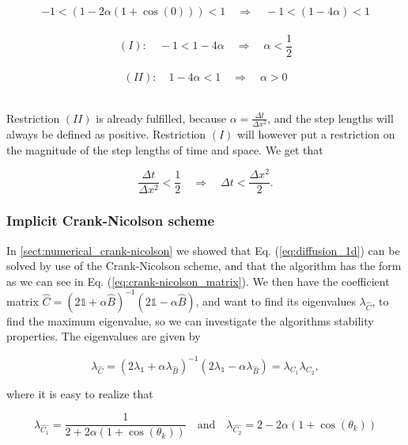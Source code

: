 \documentclass[12pt]{article}
\begin{document}
\begin{flushleft}
\vspace{5mm}
$$-1 < (1-2\alpha(1+\cos(0))) < 1 \quad\Rightarrow\quad -1 < (1-4\alpha) < 1 $$\\
$$(I):\quad -1 <1-4\alpha \quad\Rightarrow\quad \alpha < \frac{1}{2}$$\\
$$(II):\quad 1-4\alpha < 1 \quad\Rightarrow\quad \alpha > 0$$\\
\vspace{5mm} 

Restriction $(II)$ is already fulfilled, because $\alpha = \frac{\Delta t}{\Delta x^2}$, and the step lengths will always be defined as positive. Restriction $(I)$ will however put a restriction on the magnitude of the step lengths of time and space. We get that

\vspace{5mm}
\begin{equation}\label{eq:restriction_bkwrd_Euler}
\frac{\Delta t}{\Delta x^2} <\frac{1}{2} \quad\Rightarrow\quad \Delta t < \frac{\Delta x^2}{2}.
\end{equation}
\vspace{5mm}

\subsubsection{Implicit Crank-Nicolson scheme\label{sect:eigvals_Crank-Nicolson}}
In \ref{sect:numerical_crank-nicolson} we showed that Eq. (\ref{eq:diffusion_1d}) can be solved by use of the Crank-Nicolson scheme, and that the algorithm has the form as we can see in Eq. (\ref{eq:crank-nicolson_matrix}). We then have the coefficient matrix $\hat{C} = (2\mathbb{1} + \alpha\hat{B})^{-1}(2\mathbb{1} - \alpha\hat{B})$, and want to find its eigenvalues $\lambda_{\hat{C}}$, to find the maximum eigenvalue, so we can investigate the algorithms stability properties. The eigenvalues are given by

\vspace{5mm}
\begin{equation}\label{eq:bkwrd_Euler_eigenvalues_A}
\lambda_{\hat{C}} = (2\lambda_{\mathbb{1}} + \alpha\lambda_{\hat{B}})^{-1}(2\lambda_{\mathbb{1}} - \alpha\lambda_{\hat{B}}) = \lambda_{C_1}\lambda_{C_2},
\end{equation}

where it is easy to realize that 

$$\lambda_{\hat{C_1}} = \frac{1}{2+2\alpha(1+\cos(\theta_k))}\quad\text{and}\quad \lambda_{\hat{C_2}} = 2-2\alpha(1+\cos(\theta_k))$$\\
\vspace{5mm}


\end{flushleft}
\end{document}

